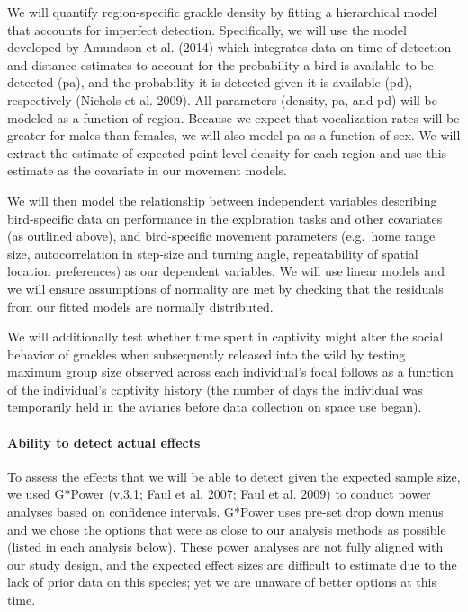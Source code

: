 \documentclass[
]{article}
\begin{document}
We will quantify region-specific grackle density by fitting a
hierarchical model that accounts for imperfect detection. Specifically,
we will use the model developed by Amundson et al. (2014) which
integrates data on time of detection and distance estimates to account
for the probability a bird is available to be detected (pa), and the
probability it is detected given it is available (pd), respectively
(Nichols et al. 2009). All parameters (density, pa, and pd) will be
modeled as a function of region. Because we expect that vocalization
rates will be greater for males than females, we will also model pa as a
function of sex. We will extract the estimate of expected point-level
density for each region and use this estimate as the covariate in our
movement models.

We will then model the relationship between independent variables
describing bird-specific data on performance in the exploration tasks
and other covariates (as outlined above), and bird-specific movement
parameters (e.g.~home range size, autocorrelation in step-size and
turning angle, repeatability of spatial location preferences) as our
dependent variables. We will use linear models and we will ensure
assumptions of normality are met by checking that the residuals from our
fitted models are normally distributed.

We will additionally test whether time spent in captivity might alter
the social behavior of grackles when subsequently released into the wild
by testing maximum group size observed across each individual's focal
follows as a function of the individual's captivity history (the number
of days the individual was temporarily held in the aviaries before data
collection on space use began).

\hypertarget{ability-to-detect-actual-effects}{%
\paragraph{Ability to detect actual
effects}\label{ability-to-detect-actual-effects}}

To assess the effects that we will be able to detect given the expected
sample size, we used G*Power (v.3.1; Faul et al. 2007; Faul et al. 2009)
to conduct power analyses based on confidence intervals. G*Power uses
pre-set drop down menus and we chose the options that were as close to
our analysis methods as possible (listed in each analysis below). These
power analyses are not fully aligned with our study design, and the
expected effect sizes are difficult to estimate due to the lack of prior
data on this species; yet we are unaware of better options at this time.
\end{document}
